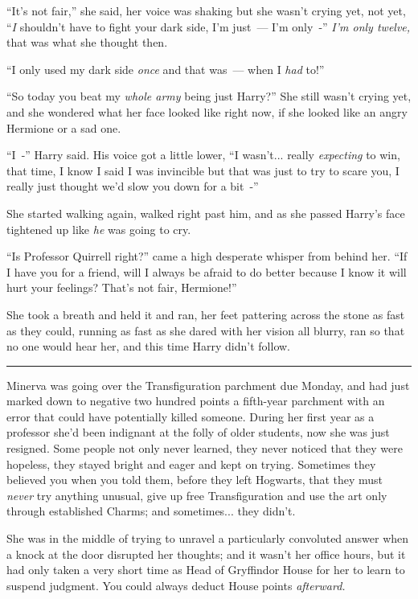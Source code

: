 ``It's not fair,'' she said, her voice was shaking but she wasn't crying yet, not yet, ``\emph{I} shouldn't have to fight your dark side, I'm just~--- I'm only~-'' \emph{I'm only twelve,} that was what she thought then.

``I only used my dark side \emph{once} and that was~--- when I \emph{had} to!''

``So today you beat my \emph{whole army} being just Harry?'' She still wasn't crying yet, and she wondered what her face looked like right now, if she looked like an angry Hermione or a sad one.

``I~-'' Harry said. His voice got a little lower, ``I wasn't... really \emph{expecting} to win, that time, I know I said I was invincible but that was just to try to scare you, I really just thought we'd slow you down for a bit~-''

She started walking again, walked right past him, and as she passed Harry's face tightened up like \emph{he} was going to cry.

``Is Professor Quirrell right?'' came a high desperate whisper from behind her. ``If I have you for a friend, will I always be afraid to do better because I know it will hurt your feelings? That's not fair, Hermione!''

She took a breath and held it and ran, her feet pattering across the stone as fast as they could, running as fast as she dared with her vision all blurry, ran so that no one would hear her, and this time Harry didn't follow.

\begin{center}\rule{3in}{0.4pt}\end{center}

Minerva was going over the Transfiguration parchment due Monday, and had just marked down to negative two hundred points a fifth-year parchment with an error that could have potentially killed someone. During her first year as a professor she'd been indignant at the folly of older students, now she was just resigned. Some people not only never learned, they never noticed that they were hopeless, they stayed bright and eager and kept on trying. Sometimes they believed you when you told them, before they left Hogwarts, that they must \emph{never} try anything unusual, give up free Transfiguration and use the art only through established Charms; and sometimes... they didn't.

She was in the middle of trying to unravel a particularly convoluted answer when a knock at the door disrupted her thoughts; and it wasn't her office hours, but it had only taken a very short time as Head of Gryffindor House for her to learn to suspend judgment. You could always deduct House points \emph{afterward.}

